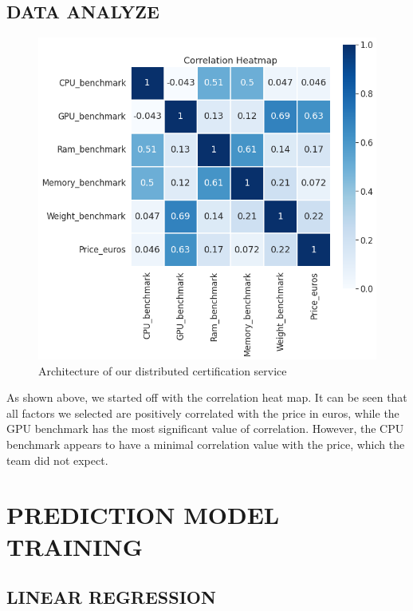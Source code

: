 \documentclass{scrartcl}
\begin{document}
\subsection{DATA ANALYZE}

\begin{figure}[H]
	\begin{center}
		\includegraphics[scale=0.4]{Graphics/4520 final/Heat_map.png}
	\end{center}
	\caption{Architecture of our distributed certification service}
	\label{fig:heat}
\end{figure}

As shown above, we started off with the correlation heat map. It can be seen that all factors we selected are positively correlated with the price in euros, while the GPU benchmark has the most significant value of correlation. However, the CPU benchmark appears to have a minimal correlation value with the price, which the team did not expect. 

\section{PREDICTION MODEL TRAINING}

\subsection{LINEAR REGRESSION}
\end{document}
